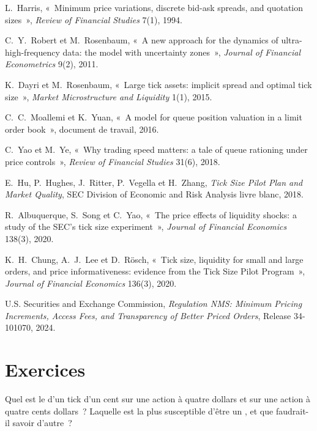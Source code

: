 \begin{omsources}
\item L.~Harris, «~Minimum price variations, discrete bid-ask spreads, and quotation sizes~», \emph{Review of Financial Studies} 7(1), 1994.
\item C.~Y.~Robert et M.~Rosenbaum, «~A new approach for the dynamics of ultra-high-frequency data: the model with uncertainty zones~», \emph{Journal of
Financial Econometrics} 9(2), 2011.
\item K.~Dayri et M.~Rosenbaum, «~Large tick assets: implicit spread and optimal tick size~», \emph{Market Microstructure and Liquidity} 1(1), 2015.
\item C.~C.~Moallemi et K.~Yuan, «~A model for queue position valuation in a limit order book~», document de travail, 2016.
\item C.~Yao et M.~Ye, «~Why trading speed matters: a tale of queue rationing under price controls~», \emph{Review of Financial Studies} 31(6), 2018.
\item E.~Hu, P.~Hughes, J.~Ritter, P.~Vegella et H.~Zhang, \emph{Tick Size Pilot Plan and Market Quality}, SEC Division of Economic and Risk Analysis
livre blanc, 2018.
\item R.~Albuquerque, S.~Song et C.~Yao, «~The price effects of liquidity shocks: a study of the SEC's tick size experiment~», \emph{Journal of Financial
Economics} 138(3), 2020.
\item K.~H.~Chung, A.~J.~Lee et D.~Rösch, «~Tick size, liquidity for small and large orders, and price informativeness: evidence from the Tick Size Pilot
Program~», \emph{Journal of Financial Economics} 136(3), 2020.
\item U.S. Securities and Exchange Commission, \emph{Regulation NMS: Minimum Pricing Increments, Access Fees, and Transparency of Better Priced Orders},
Release 34-101070, 2024.
\end{omsources}

\section{Exercices}

\begin{exercise}[$\star$]\label{exo:mx:tick-size-queues-and-priority:1}
Quel est le  d'un tick d'un cent sur une action à quatre dollars et sur une action à quatre cents dollars~? Laquelle est la plus susceptible d'être un
, et que faudrait-il savoir d'autre~?
\end{exercise}

